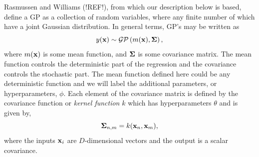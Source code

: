 Rasmussen and Williams (!REF!), from which our description below is based, define a GP as a collection of random variables, where any finite number of which have a joint Gaussian distribution.  In general terms, GP's may be written as
\begin{equation}
y({\bf x}) \sim \mathcal{GP}\left( m({\bf x}), {\bf \Sigma}\right),
\end{equation}
where $m({\bf x})$ is some mean function, and ${\bf \Sigma}$ is some covariance matrix.  The mean function controls the deterministic part of the regression and the covariance controls the stochastic part.  The mean function defined here could be any deterministic function and we will label the additional parameters, or hyperparameters, $\phi$.  Each element of the covariance matrix is defined by the covariance function or {\it kernel function} $k$ which has hyperparameters $\theta$ and is given by,
\begin{equation}
{\bf \Sigma}_{n, m} = k({\bf x}_{n}, {\bf x}_{m}),
\end{equation}
where the inputs ${\bf x}_{i}$ are $D$-dimensional vectors and the output is a scalar covariance.

